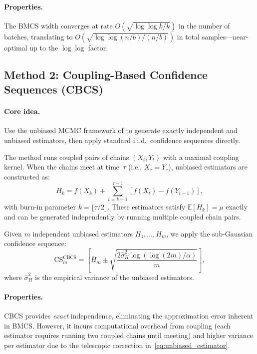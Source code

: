 \documentclass[11pt]{article}
\newcommand{\E}{\mathbb{E}}
\newcommand{\CS}{\mathrm{CS}}
\begin{document}
\paragraph{Properties.} The BMCS width converges at rate $O(\sqrt{\log\log k / k})$ in the number of batches, translating to $O(\sqrt{\log\log(n/b) / (n/b)})$ in total samples---near-optimal up to the $\log\log$ factor.

\subsection{Method 2: Coupling-Based Confidence Sequences (CBCS)}

\paragraph{Core idea.} Use the unbiased MCMC framework of \citet{jacob2020unbiased} to generate exactly independent and unbiased estimators, then apply standard i.i.d.\ confidence sequences directly.

The method runs coupled pairs of chains $(X_t, Y_t)$ with a maximal coupling kernel. When the chains meet at time~$\tau$ (i.e., $X_\tau = Y_\tau$), unbiased estimators are constructed as:
\begin{equation}
H_k = f(X_k) + \sum_{t=k+1}^{\tau-1} [f(X_t) - f(Y_{t-1})],
\label{eq:unbiased_estimator}
\end{equation}
with burn-in parameter $k = \lfloor \tau/2 \rfloor$. These estimators satisfy $\E[H_k] = \mu$ exactly and can be generated independently by running multiple coupled chain pairs.

Given $m$ independent unbiased estimators $H_1, \ldots, H_m$, we apply the sub-Gaussian confidence sequence:
\begin{equation}
\CS_m^{\text{CBCS}} = \left[\bar{H}_m \pm \sqrt{\frac{2\hat{\sigma}^2_H \log(\log(2m)/\alpha)}{m}}\right],
\label{eq:cbcs}
\end{equation}
where $\hat{\sigma}^2_H$ is the empirical variance of the unbiased estimators.

\paragraph{Properties.} CBCS provides \emph{exact} independence, eliminating the approximation error inherent in BMCS. However, it incurs computational overhead from coupling (each estimator requires running two coupled chains until meeting) and higher variance per estimator due to the telescopic correction in~\eqref{eq:unbiased_estimator}.
\end{document}
